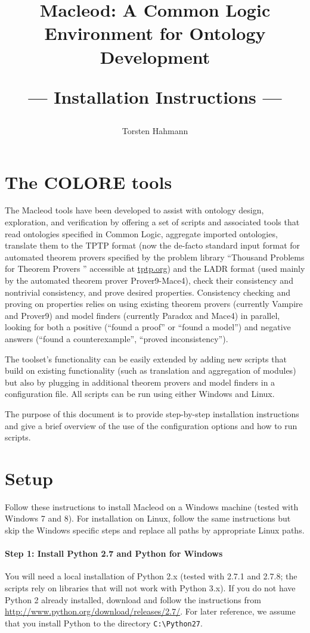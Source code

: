 \documentclass{article}
\title{Macleod: A Common Logic Environment for Ontology Development\\
\begin{Large}
--- Installation Instructions ---
\end{Large}
}
\author{Torsten Hahmann}
\begin{document}
\maketitle

\section{The COLORE tools}

The Macleod tools have been developed to assist with ontology design, exploration, and verification by offering a set of scripts and associated tools that read ontologies specified in Common Logic, aggregate imported ontologies, translate them to the TPTP format (now the de-facto standard input format for automated theorem provers specified by the problem library ``Thousand Problems for Theorem Provers '' accessible at \url{tptp.org}) and the LADR format (used mainly by the automated theorem prover Prover9-Mace4), check their consistency and nontrivial consistency, and prove desired properties. Consistency checking and proving on properties relies on using existing theorem provers (currently Vampire and Prover9) and model finders (currently Paradox and Mace4) in parallel, looking for both a positive (``found a proof'' or ``found a model'') and negative answers (``found a counterexample'', ``proved inconsistency''). 

The toolset's functionality can be easily extended by adding new scripts that build on existing functionality (such as translation and aggregation of modules) but also by plugging in additional theorem provers and model finders in a configuration file.
All scripts can be run using either Windows and Linux.

The purpose of this document is to provide step-by-step installation instructions and give a brief overview of the use of the configuration options and how to run scripts. 

\section{Setup}

Follow these instructions to install Macleod on a Windows machine (tested with Windows 7 and 8).  For installation on Linux, follow the same instructions but skip the Windows specific steps and replace all paths by appropriate Linux paths.

\paragraph{Step 1: Install Python 2.7 and Python for Windows}
You will need a local installation of Python 2.x (tested with 2.7.1 and 2.7.8; the scripts rely on libraries that will not work with Python 3.x). If you do not have Python 2 already installed, download and follow the instructions from \url{http://www.python.org/download/releases/2.7/}.
For later reference, we assume that you install Python to the directory \texttt{C:\textbackslash Python27}.
\end{document}
